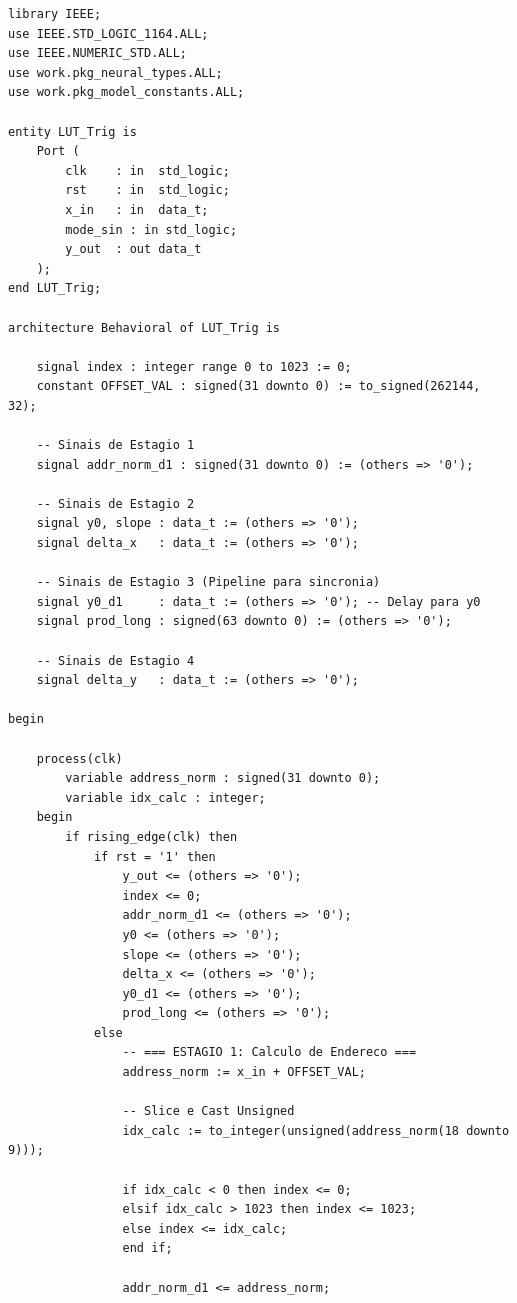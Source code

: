 \documentclass[a4paper,12pt]{article}
\begin{document}
\begin{lstlisting}[style=vhdlstyle,
    caption={C\'odigo VHDL do \texttt{LUT\_Trig}.},
    label={lst:lut_trig}]
library IEEE;
use IEEE.STD_LOGIC_1164.ALL;
use IEEE.NUMERIC_STD.ALL;
use work.pkg_neural_types.ALL;
use work.pkg_model_constants.ALL;

entity LUT_Trig is
    Port (
        clk    : in  std_logic;
        rst    : in  std_logic;
        x_in   : in  data_t;
        mode_sin : in std_logic;
        y_out  : out data_t
    );
end LUT_Trig;

architecture Behavioral of LUT_Trig is

    signal index : integer range 0 to 1023 := 0;
    constant OFFSET_VAL : signed(31 downto 0) := to_signed(262144, 32);

    -- Sinais de Estagio 1
    signal addr_norm_d1 : signed(31 downto 0) := (others => '0');

    -- Sinais de Estagio 2
    signal y0, slope : data_t := (others => '0');
    signal delta_x   : data_t := (others => '0');

    -- Sinais de Estagio 3 (Pipeline para sincronia)
    signal y0_d1     : data_t := (others => '0'); -- Delay para y0
    signal prod_long : signed(63 downto 0) := (others => '0');

    -- Sinais de Estagio 4
    signal delta_y   : data_t := (others => '0');

begin

    process(clk)
        variable address_norm : signed(31 downto 0);
        variable idx_calc : integer;
    begin
        if rising_edge(clk) then
            if rst = '1' then
                y_out <= (others => '0');
                index <= 0;
                addr_norm_d1 <= (others => '0');
                y0 <= (others => '0');
                slope <= (others => '0');
                delta_x <= (others => '0');
                y0_d1 <= (others => '0');
                prod_long <= (others => '0');
            else
                -- === ESTAGIO 1: Calculo de Endereco ===
                address_norm := x_in + OFFSET_VAL;

                -- Slice e Cast Unsigned
                idx_calc := to_integer(unsigned(address_norm(18 downto 9)));

                if idx_calc < 0 then index <= 0;
                elsif idx_calc > 1023 then index <= 1023;
                else index <= idx_calc;
                end if;

                addr_norm_d1 <= address_norm;


\end{lstlisting}
\end{document}
